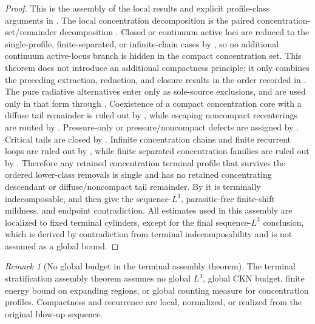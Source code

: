 \documentclass[11pt]{amsart}
\numberwithin{equation}{section}
\theoremstyle{plain}
\theoremstyle{definition}
\theoremstyle{remark}
\newtheorem{remark}[remark]{Remark}
\begin{document}
\begin{proof}
This is the assembly of the local results and explicit profile-class arguments in
.  The local
concentration decomposition is the paired concentration-set/remainder decomposition
.  Closed or continuum active loci are reduced
to the single-profile, finite-separated, or infinite-chain cases by
, so no additional continuum
active-locus branch is hidden in the compact concentration set.  This theorem does not introduce an
additional compactness principle; it only combines the preceding extraction,
reduction, and closure results in the order recorded in
.  The pure radiative alternatives enter
only as sole-source exclusions, and are used only in that form through
.  Coexistence of a compact concentration core
with a diffuse tail remainder is ruled out by
, while escaping noncompact recenterings are
routed by .  Pressure-only or
pressure/noncompact defects are assigned by
.  Critical tails are closed by
.
Infinite concentration chains and finite recurrent loops are ruled out by
, while finite separated concentration
families are ruled out by
.  Therefore any retained
concentration terminal profile that survives the ordered lower-class removals
is single and has no retained concentrating descendant or diffuse/noncompact
tail remainder.  By  it is terminally
indecomposable, and then
give the sequence-\(L^3\), parasitic-free finite-shift mildness, and endpoint
contradiction.  All estimates used in this assembly are localized to fixed
terminal cylinders, except for the final sequence-\(L^3\) conclusion, which is
derived by contradiction from terminal indecomposability and is not assumed as a
global bound.
\end{proof}

\begin{remark}[No global budget in the terminal assembly theorem]
\label{rem:no-global-budget-terminal-theorem}
The terminal stratification assembly theorem assumes no global \(L^3\), global CKN
budget, finite energy bound on expanding regions, or global counting measure
for concentration profiles.  Compactness and recurrence are local, normalized, or
realized from the original blow-up sequence.
\end{remark}
\end{document}
